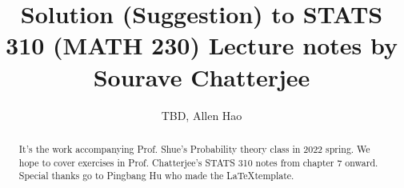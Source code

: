 \documentclass[a4paper]{article}
\author{TBD, Allen Hao}
\title{Solution (Suggestion) to STATS 310 (MATH 230) Lecture notes by Sourave Chatterjee}
\begin{document}
\maketitle

\begin{abstract}
	It's the work accompanying Prof. Shue's Probability theory class in 2022 spring. We hope to cover exercises in Prof. Chatterjee's STATS 310 notes \cite{ChatterjeeSTATS310} from chapter 7 onward. 
	Special thanks go to Pingbang Hu \cite{PbbTemplate} who made the \LaTeX template.
\end{abstract}

\tableofcontents

\setcounter{section}{6} %

\newpage
\appendix
\appendixpage



\newpage
\printbibliography
\end{document}

